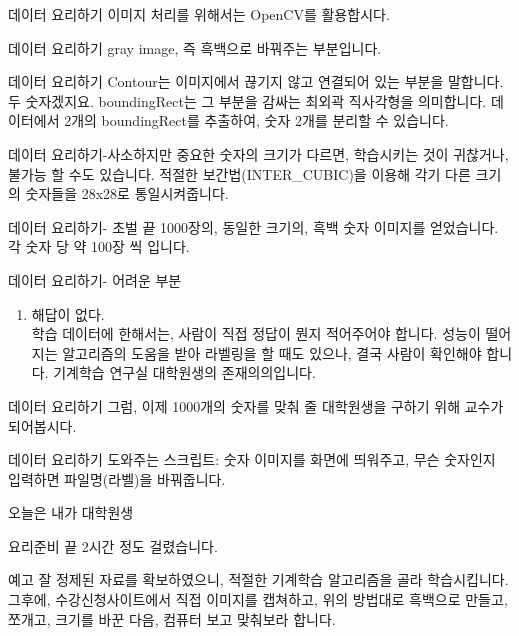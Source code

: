 \documentclass{beamer}
\begin{document}
\begin{frame}{데이터 요리하기}
  이미지 처리를 위해서는 OpenCV를 활용합시다.
\end{frame}

\begin{frame}{데이터 요리하기}
  gray image, 즉 흑백으로 바꿔주는 부분입니다.
\end{frame}

\begin{frame}{데이터 요리하기}
  Contour는 이미지에서 끊기지 않고 연결되어 있는 부분을 말합니다.
  두 숫자겠지요. boundingRect는 그 부분을 감싸는 최외곽 직사각형을 의미합니다.
  데이터에서 2개의 boundingRect를 추출하여, 숫자 2개를 분리할 수 있습니다.
\end{frame}

\begin{frame}{데이터 요리하기-사소하지만 중요한}
  숫자의 크기가 다르면, 학습시키는 것이 귀찮거나, 불가능 할 수도 있습니다.
  적절한 보간법(INTER\_CUBIC)을 이용해 각기 다른 크기의 숫자들을 28x28로
  통일시켜줍니다.
\end{frame}

\begin{frame}{데이터 요리하기- 초벌 끝}
  1000장의, 동일한 크기의, 흑백 숫자 이미지를 얻었습니다. 각 숫자 당 약 100장
  씩 입니다.
\end{frame}

\begin{frame}{데이터 요리하기- 어려운 부분}
  \begin{enumerate}
    \item 해답이 없다.\\
      학습 데이터에 한해서는, 사람이 직접 정답이 뭔지 적어주어야 합니다.
      성능이 떨어지는 알고리즘의 도움을 받아
      라벨링을 할 때도 있으나, 결국 사람이 확인해야 합니다.
      기계학습 연구실 대학원생의 존재의의입니다.\\
  \end{enumerate}
\end{frame}

\begin{frame}{데이터 요리하기}
  그럼, 이제 1000개의 숫자를 맞춰 줄 대학원생을 구하기 위해 교수가 되어봅시다.
\end{frame}

\begin{frame}{데이터 요리하기}
  도와주는 스크립트: 숫자 이미지를 화면에 띄워주고, 무슨 숫자인지
  입력하면 파일명(라벨)을 바꿔줍니다.
\end{frame}

\begin{frame}{오늘은 내가 대학원생}
\end{frame}

\begin{frame}{요리준비 끝}
2시간 정도 걸렸습니다.
\end{frame}

\begin{frame}{예고}
잘 정제된 자료를 확보하였으니, 적절한 기계학습 알고리즘을 골라 학습시킵니다.
그후에, 수강신청사이트에서 직접 이미지를 캡쳐하고, 위의 방법대로 흑백으로
  만들고, 쪼개고, 크기를 바꾼 다음, 컴퓨터 보고 맞춰보라 합니다.
\end{frame}
\end{document}
